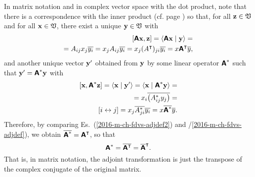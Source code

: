 In matrix notation and in complex vector space with the dot product,
note that there is a correspondence with the inner product
(cf. page \pageref{2011-m-corr-bil-ip})
so that, for all ${\bf z}\in {\frak V}$ and for all ${\bf x}\in {\frak V}$,
there exist a unique ${\bf y}\in {\frak V}$ with
\begin{equation}
\begin{split}
[\textsf{\textbf{A}}{\bf x}, {\bf z}]
=\langle \textsf{\textbf{A}} {\bf x}\mid {\bf y}\rangle
= \\
=A_{ij}   x_j \overline{y_i}
= x_j A_{ij}  \overline{y_i}
= x_j (A^\intercal )_{ji}  \overline{y_i}
= x  \textsf{\textbf{A}}^\intercal  \overline{ y },
\end{split}
\label{2016-m-ch-fdvs-adjdef}
\end{equation}
and another unique vector ${\bf y}'$ obtained from ${\bf y}$ by
some linear operator $\textsf{\textbf{A}}^\ast$
such that ${\bf y}'=\textsf{\textbf{A}}^\ast {\bf y}$ with
\begin{equation}
\begin{split}
[{\bf x}, \textsf{\textbf{A}}^\ast {\bf z}]
= \langle {\bf x}\mid {\bf y}'\rangle
= \langle {\bf x}\mid \textsf{\textbf{A}}^\ast {\bf y}\rangle
=\\
= x_i \overline{ \left(A_{ij}^\ast y_j \right) }
=\\
[ i \leftrightarrow j]
= x_j \overline{  A_{ji}^\ast} \overline{  y_i  }
=    x \overline{\textsf{\textbf{A}}^\ast} \overline{y}.
\end{split}
\label{2016-m-ch-fdvs-adjdef2}
\end{equation}
Therefore, by comparing Es.~(\ref{2016-m-ch-fdvs-adjdef2}) and /\ref{2016-m-ch-fdvs-adjdef}),  we obtain $\overline{ \textsf{\textbf{A}}^\ast}=\textsf{\textbf{A}}^\intercal $, so that
\begin{equation}
\textsf{\textbf{A}}^\ast =\overline{\textsf{\textbf{A}}^\intercal } = \overline{\textsf{\textbf{A}}}^\intercal .
\end{equation}
That is, in matrix notation, the adjoint transformation is just the
transpose of the complex conjugate of the original matrix.

